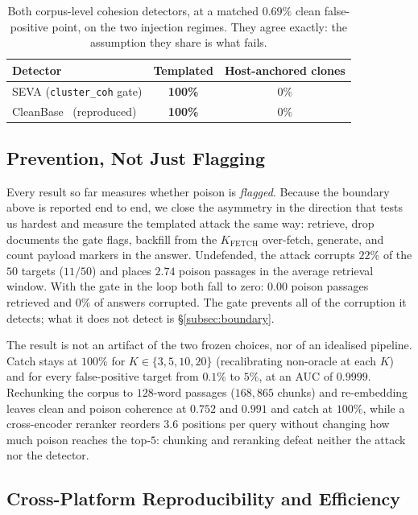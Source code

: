 \documentclass[10pt,journal,compsoc]{IEEEtran}
\begin{document}
\begin{table}[t]
\centering
\caption{Both corpus-level cohesion detectors, at a matched $0.69\%$ clean false-positive point,
on the two injection regimes. They agree exactly: the assumption they share is what fails.}
\label{tab:boundary}
\begin{tabular}{lcc}
\toprule
Detector & Templated & Host-anchored clones \\
\midrule
SEVA (\texttt{cluster\_coh} gate) & \textbf{100\%} & $0\%$ \\
CleanBase~\cite{cleanbase} (reproduced) & \textbf{100\%} & $0\%$ \\
\bottomrule
\end{tabular}
\end{table}

\subsection{Prevention, Not Just Flagging}
\label{subsec:e2e}
Every result so far measures whether poison is \emph{flagged}. Because the boundary above is
reported end to end, we close the asymmetry in the direction that tests us hardest and measure
the templated attack the same way: retrieve, drop documents the gate flags, backfill from the
$K_{\mathrm{FETCH}}$ over-fetch, generate, and count payload markers in the answer. Undefended,
the attack corrupts $22\%$ of the $50$ targets ($11/50$) and places $2.74$ poison passages in the average
retrieval window. With the gate in the loop both fall to zero: $0.00$ poison passages retrieved
and $0\%$ of answers corrupted. The gate prevents all of the corruption it detects; what it does
not detect is \S\ref{subsec:boundary}.

The result is not an artifact of the two frozen choices, nor of an idealised pipeline. Catch
stays at $100\%$ for $K\in\{3,5,10,20\}$ (recalibrating non-oracle at each $K$) and for every
false-positive target from $0.1\%$ to $5\%$, at an AUC of $0.9999$. Rechunking the corpus to
$128$-word passages ($168{,}865$ chunks) and re-embedding leaves clean and poison coherence at
$0.752$ and $0.991$ and catch at $100\%$, while a cross-encoder reranker reorders $3.6$ positions
per query without changing how much poison reaches the top-$5$: chunking and reranking defeat
neither the attack nor the detector.

\subsection{Cross-Platform Reproducibility and Efficiency}
\label{subsec:eff}
\end{document}
